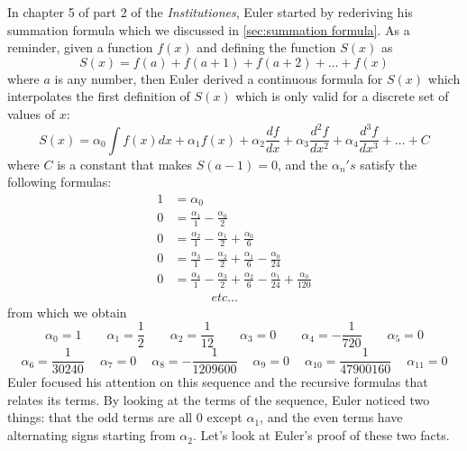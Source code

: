 In chapter 5 of part 2 of the \textit{Institutiones}, Euler started by rederiving his summation formula which we discussed in \autoref{sec:summation formula}. As a reminder, given a function $f(x)$ and defining the function $S(x)$ as
\begin{equation}
    S(x) = f(a) + f(a+1) + f(a+2) + \dots + f(x)
\end{equation}
where $a$ is any number, then Euler derived a continuous formula for $S(x)$ which interpolates the first definition of $S(x)$ which is only valid for a discrete set of values of $x$:
\begin{equation}
    S(x) = \alpha_0\int f(x)dx + \alpha_1f(x) + \alpha_2\frac{df}{dx} + \alpha_3\frac{d^2f}{dx^2} + \alpha_4\frac{d^3f}{dx^3} + \dots + C
\end{equation}
where $C$ is a constant that makes $S(a-1) = 0$, and the $\alpha_n's$ satisfy the following formulas:
\begin{align*}
    1 &= \alpha_0\\
    0 &= \frac{\alpha_1}{1} - \frac{\alpha_0}{2} \\
    0 &= \frac{\alpha_2}{1} - \frac{\alpha_1}{2} + \frac{\alpha_0}{6}\\
    0 &= \frac{\alpha_3}{1} - \frac{\alpha_2}{2} + \frac{\alpha_1}{6} - \frac{\alpha_0}{24} \\
    0 &= \frac{\alpha_4}{1} - \frac{\alpha_3}{2} + \frac{\alpha_2}{6} - \frac{\alpha_1}{24} + \frac{\alpha_0}{120}\\
    & \quad \qquad etc \dots
\end{align*}
from which we obtain
$$\alpha_0 = 1 \qquad \alpha_1 = \frac{1}{2} \qquad \alpha_2 = \frac{1}{12} \qquad \alpha_3 = 0 \qquad \alpha_4 = - \frac{1}{720} \qquad \alpha_5 = 0 $$
$$\alpha_6 = \frac{1}{30240} \quad \ \alpha_7 = 0 \quad \ \alpha_8 = -\frac{1}{1209600} \quad \ \alpha_9 = 0 \quad \ \alpha_{10} = \frac{1}{47900160} \quad \ \alpha_{11} = 0$$
Euler focused his attention on this sequence and the recursive formulas that relates its terms. By looking at the terms of the sequence, Euler noticed two things: that the odd terms are all 0 except $\alpha_1$, and the even terms have alternating signs starting from $\alpha_2$. Let's look at Euler's proof of these two facts.

